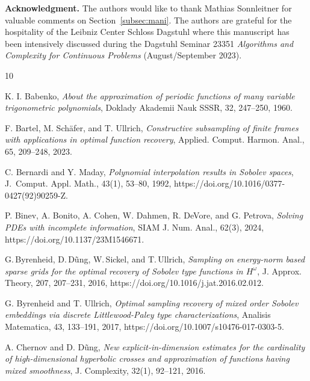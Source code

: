 \documentclass[a4paper,12pt]{amsart}
\theoremstyle{definition}
\theoremstyle{remark}
\begin{document}
{\vskip5mm


{\bf Acknowledgment.} The authors would like to thank Mathias Sonn\-leit\-ner for valuable comments on Section~\ref{subsec:mani}. 
The authors are grateful for the hospitality of the Leibniz Center Schloss Dagstuhl where this manuscript has been intensively discussed during the Dagstuhl Seminar 23351 {\it Algorithms and Complexity for Continuous Problems} (August/September 2023).




\begin{thebibliography}{10}

K. I. Babenko, 
{\it About the approximation of periodic functions of many variable trigonometric polynomials},
Doklady Akademii Nauk SSSR, 32, 247--250, 1960.



 F. Bartel, M. Sch\"afer, and T. Ullrich, {\it Constructive subsampling of finite frames with applications in optimal function recovery}, Applied. Comput. Harmon. Anal., {65, 209--248, 2023.}

C. Bernardi and Y. Maday, 
{\it  Polynomial interpolation results in {S}obolev spaces},
{J.~Comput. Appl. Math.},
 {43(1)}, 53--80,
 {1992},
    {https://doi.org/10.1016/0377-0427(92)90259-Z}.



P. Binev, A. Bonito, A. Cohen, W. Dahmen, R. DeVore, and G. Petrova,
{\it Solving PDEs with incomplete information},
{SIAM J. Num. Anal., 62(3), 2024, https://doi.org/10.1137/23M1546671.
}



G.\,Byrenheid, D.\,D\~ung, W.\,Sickel, and T.\,Ullrich,
{\it Sampling on energy-norm based sparse grids for the optimal recovery of {S}obolev type functions in $H^\omega$},
J. Approx. Theory,
 207, 207--231,
2016,
https://doi.org/10.1016/j.jat.2016.02.012.

 G. Byrenheid and T. Ullrich,
{\it Optimal sampling recovery of mixed order Sobolev embeddings
via discrete Littlewood-Paley type characterizations}, Analisis Matematica,
{43, 133--191},
2017,
{https://doi.org/10.1007/s10476-017-0303-5.}

{A. Chernov and D. D\~ung,
{\it New explicit-in-dimension estimates for the cardinality of high-dimensional hyperbolic crosses and approximation of functions having mixed smoothness}, J. Complexity, 32(1), 92--121, 
2016.
}


\end{thebibliography}}
\end{document}
